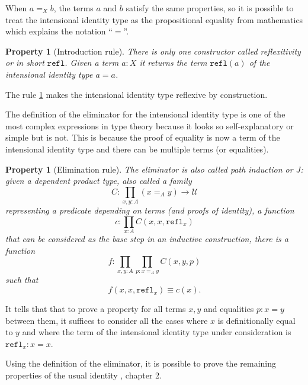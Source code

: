 \documentclass[12pt,a4paper,twoside,xetex]{book} %
\newcommand{\keyword}[1]{\emph{#1}\index{#1}}
\newtheorem{property}[theorem]{Property}
\newcommand{\op}[1]{\mathtt{#1}}
\begin{document}
When $a=_X b$, the terms $a$ and $b$ satisfy the  same properties, so it is possible to treat the intensional identity type as the propositional equality from mathematics which explains the notation ``$=$''. 

\begin{property}[Introduction rule]\label{reflprop}
There is only one constructor called \keyword{reflexitivity} or in short 
$\op{refl}$. Given a term $a:X$ it returns the term $\op{refl}(a)$ of the 
intensional identity type  $a = a$. 
\end{property}

The rule \cref{reflprop} makes the intensional identity type reflexive by construction.

The definition of the eliminator for the intensional identity type is one of 
the most complex expressions in type theory because it looks so self-explanatory 
or simple but is not. This is because the proof of equality is now a term of 
the intensional identity type and there can be multiple terms (or equalities). 

\begin{property}[Elimination rule]\label{pathindprop}
The eliminator is also called \keyword{path 
induction} or $J$: given a dependent product type, also called a 
family
$$C : \prod_{x,y:A} (x =_A y) \rightarrow \mathcal{U}$$
representing a predicate depending on terms (and proofs of identity), a 
function $$c:\prod_{x:A} C(x,x,\op{refl}_x)$$ that can be considered as the base 
step in an inductive construction, there is a function $$f: \prod_{x,y:A} 
\prod_{p:x=_Ay}C(x,y,p)$$ such that $$f(x,x,\op{refl}_x) \equiv c(x).$$
\end{property}


It tells that that to prove a property for all terms $x,y$ and equalities 
$p:x=y$ between them, it suffices to consider all the cases where $x$ is 
definitionally equal to $y$ and where the term of the intensional identity type 
under consideration is $\op{refl}_x : x = x$.


 Using the 
definition of the eliminator, it is possible to prove the remaining properties 
of the usual identity \cite{Voevodsky2013}, chapter 2. 
\end{document}
